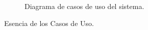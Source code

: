 \begin{figure}[htbp]
	\begin{center}
		\caption{Diagrama de casos de uso del sistema.}
		\label{fig:casosDeUso}
	\end{center}
\end{figure}
Esencia de los Casos de Uso.




